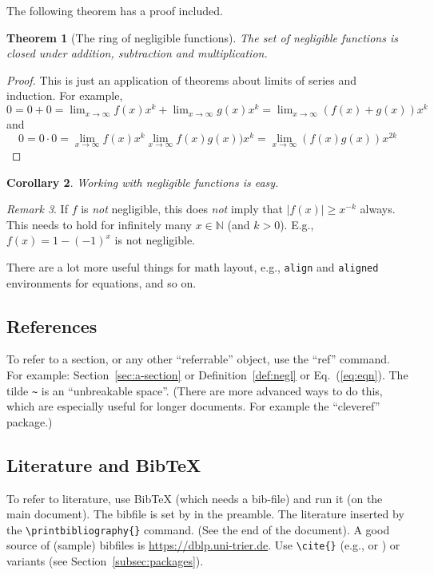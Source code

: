 \documentclass[11pt]{scrartcl}
\theoremstyle{plain} %
\newtheorem{theorem}{Theorem} %
\newtheorem{corollary}[theorem]{Corollary}
\theoremstyle{definition} %
\theoremstyle{remark} %
\newtheorem{remark}[theorem]{Remark}
\newcommand{\IN}{\mathbb{N}} %
\begin{document}
The following theorem has a proof included.

\begin{theorem}[The ring of negligible functions]
	The set of negligible functions is closed under addition, subtraction and multiplication.
\end{theorem}
\begin{proof}
	This is just an application of theorems about limits of series and induction.
	For example, $0 = 0 + 0 = \lim_{x \to \infty} f(x)x^k + \lim_{x \to \infty} g(x)x^k = \lim_{x \to \infty} (f(x) + g(x))x^k$
	and
	\begin{equation*}
		0 = 0 \cdot 0 = \lim_{x \to \infty} f(x) x^{k} \lim_{x \to \infty} f(x) g(x)) x^{k} = \lim_{x \to \infty} (f(x) g(x)) x^{2k}
	\end{equation*}
\end{proof}

\begin{corollary}
	Working with negligible functions is easy.
\end{corollary}

\begin{remark}
	If $f$ is \emph{not} negligible,
	this does \emph{not} imply that $|f(x)| \geq x^{-k}$ always.
	This needs to hold for infinitely many $x \in \IN$ (and $k > 0$).
	E.g., $f(x) = 1 - (-1)^x$ is not negligible.
\end{remark}

There are a lot more useful things for math layout,
e.g., \verb|align| and \verb|aligned| environments for equations, and so on.

\subsection{References}
\label{sec:references}

To refer to a section, or any other ``referrable'' object, use the ``ref'' command.
For example: Section~\ref{sec:a-section} or Definition~\ref{def:negl} or Eq.~(\ref{eq:eqn}).
The tilde \verb|~| is an ``unbreakable space''.
(There are more advanced ways to do this, which are especially useful for longer documents.
For example the ``cleveref'' package.)


\subsection{Literature and BibTeX}
\label{subsec:literature}

To refer to literature, use BibTeX (which needs a bib-file) and run it (on the main document).
The bibfile is set by \verb|| in the preamble.
The literature inserted by the \verb|\printbibliography{}| command. (See the end of the document).
A good source of (sample) bibfiles is \url{https://dblp.uni-trier.de}.
Use \verb|\cite{}| (e.g., \cite{DH76} or \cite{RSA78}) or variants (see Section~\ref{subsec:packages}).
\end{document}
